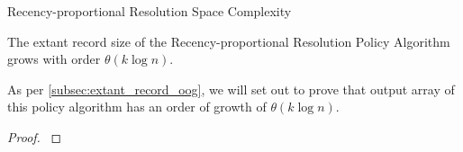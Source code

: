 \begin{theorem}{Recency-proportional Resolution Space Complexity}
\label{thm:recency-proportional-resolution-algo-space-complexity}

The \gls{extant record size} of the Recency-proportional Resolution Policy Algorithm grows with order $\theta{(k \log{n})}.$

\end{theorem}


As per \ref{subsec:extant_record_oog}, we will set out to prove that output array of this policy algorithm has an order of growth of $\theta{(k \log{n})}.$


\begin{proof}
\label{prf:recency-proportional-resolution-algo-space-complexity}



\end{proof}
